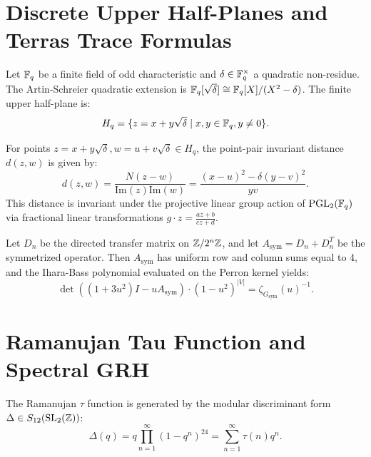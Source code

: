 \section{Discrete Upper Half-Planes and Terras Trace Formulas}

\begin{definition}
\label{def:finite_upper_half_plane}
\leanok
Let $\mathbb{F}_q$ be a finite field of odd characteristic and $\delta \in \mathbb{F}_q^\times$ a quadratic non-residue. The Artin-Schreier quadratic extension is $\mathbb{F}_q[\sqrt{\delta}] \cong \mathbb{F}_q[X]/(X^2 - \delta)$. The finite upper half-plane is:
\[
H_q = \{ z = x + y\sqrt{\delta} \mid x, y \in \mathbb{F}_q, y \neq 0 \}.
\]
\end{definition}

\begin{definition}
\label{def:terras_distance}
\leanok
For points $z = x + y\sqrt{\delta}, w = u + v\sqrt{\delta} \in H_q$, the point-pair invariant distance $d(z, w)$ is given by:
\[
d(z, w) = \frac{N(z - w)}{\mathrm{Im}(z) \mathrm{Im}(w)} = \frac{(x - u)^2 - \delta (y - v)^2}{y v}.
\]
This distance is invariant under the projective linear group action of $\mathrm{PGL}_2(\mathbb{F}_q)$ via fractional linear transformations $g \cdot z = \frac{a z + b}{c z + d}$.
\end{definition}

\begin{theorem}
\label{thm:dynamical_ihara_bridge}
\leanok
Let $D_n$ be the directed transfer matrix on $\mathbb{Z}/2^n\mathbb{Z}$, and let $A_{\mathrm{sym}} = D_n + D_n^T$ be the symmetrized operator. Then $A_{\mathrm{sym}}$ has uniform row and column sums equal to 4, and the Ihara-Bass polynomial evaluated on the Perron kernel yields:
\[
\det\left((1 + 3 u^2) I - u A_{\mathrm{sym}}\right) \cdot (1 - u^2)^{|V|} = \zeta_{G_{\mathrm{sym}}}(u)^{-1}.
\]
\end{theorem}

\section{Ramanujan Tau Function and Spectral GRH}

\begin{definition}
\label{def:ramanujan_tau}
\leanok
The Ramanujan $\tau$ function is generated by the modular discriminant form $\Delta \in S_{12}(\mathrm{SL}_2(\mathbb{Z}))$:
\[
\Delta(q) = q \prod_{n=1}^\infty (1 - q^n)^{24} = \sum_{n=1}^\infty \tau(n) q^n.
\]
\end{definition}

